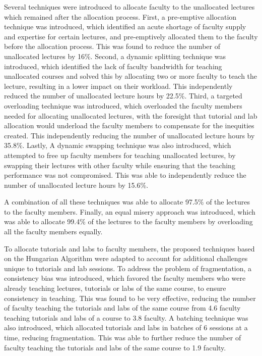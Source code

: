 Several techniques were introduced to allocate faculty to the unallocated lectures which remained after the allocation process. First, a pre-emptive allocation technique was introduced, which identified an acute shortage of faculty supply and expertise for certain lectures, and pre-emptively allocated them to the faculty before the allocation process. This was found to reduce the number of unallocated lectures by 16\%. Second, a dynamic splitting technique was introduced, which identified the lack of faculty bandwidth for teaching unallocated courses and solved this by allocating two or more faculty to teach the lecture, resulting in a lower impact on their workload. This independently reduced the number of unallocated lecture hours by 22.5\%. Third, a targeted overloading technique was introduced, which overloaded the faculty members needed for allocating unallocated lectures, with the foresight that tutorial and lab allocation would underload the faculty members to compensate for the inequities created. This independently reducing the number of unallocated lecture hours by 35.8\%. Lastly, A dynamic swapping technique was also introduced, which attempted to free up faculty members for teaching unallocated lectures, by swapping their lectures with other faculty while ensuring that the teaching performance was not compromised. This was able to independently reduce the number of unallocated lecture hours by 15.6\%.

A combination of all these techniques was able to allocate 97.5\% of the lectures to the faculty members. Finally, an equal misery approach was introduced, which was able to allocate 99.4\% of the lectures to the faculty members by overloading all the faculty members equally.

To allocate tutorials and labs to faculty members, the proposed techniques based on the Hungarian Algorithm were adapted to account for additional challenges unique to tutorials and lab sessions. To address the problem of fragmentation, a consistency bias was introduced, which favored the faculty members who were already teaching lectures, tutorials or labs of the same course, to ensure consistency in teaching. This was found to be very effective, reducing the number of faculty teaching the tutorials and labs of the same course from 4.6 faculty teaching tutorials and labs of a course to 3.8 faculty. A batching technique was also introduced, which allocated tutorials and labs in batches of 6 sessions at a time, reducing fragmentation. This was able to further reduce the number of faculty teaching the tutorials and labs of the same course to 1.9 faculty.

